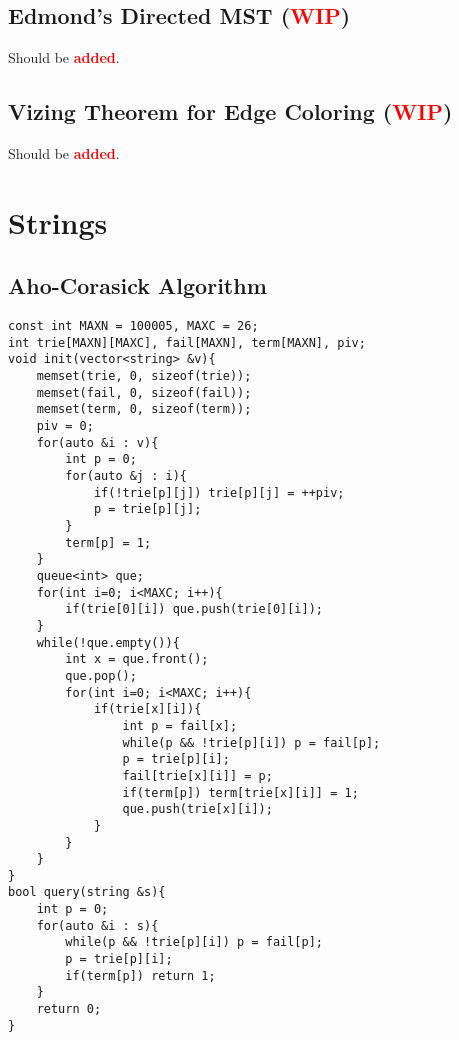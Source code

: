 \documentclass[landscape, 8pt, a4paper, oneside,  twocolumn]{extarticle}
\newcommand{\added}{Should be \textcolor{red}{\textbf{added}}.}
\newcommand{\WIP}{\textcolor{red}{\textbf{WIP}}}
\begin{document}
\subsection {Edmond's Directed MST (\WIP)}
\added

\subsection {Vizing Theorem for Edge Coloring (\WIP)}
\added

\section{Strings}

\subsection{Aho-Corasick Algorithm}
\begin{verbatim}
const int MAXN = 100005, MAXC = 26;
int trie[MAXN][MAXC], fail[MAXN], term[MAXN], piv;
void init(vector<string> &v){
	memset(trie, 0, sizeof(trie));
	memset(fail, 0, sizeof(fail));
	memset(term, 0, sizeof(term));
	piv = 0;
	for(auto &i : v){
		int p = 0;
		for(auto &j : i){
			if(!trie[p][j]) trie[p][j] = ++piv;
			p = trie[p][j];
		}
		term[p] = 1;
	}
	queue<int> que;
	for(int i=0; i<MAXC; i++){
		if(trie[0][i]) que.push(trie[0][i]);
	}
	while(!que.empty()){
		int x = que.front();
		que.pop();
		for(int i=0; i<MAXC; i++){
			if(trie[x][i]){
				int p = fail[x];
				while(p && !trie[p][i]) p = fail[p];
				p = trie[p][i];
				fail[trie[x][i]] = p;
				if(term[p]) term[trie[x][i]] = 1;
				que.push(trie[x][i]);
			}
		}
	}
}
bool query(string &s){
	int p = 0;
	for(auto &i : s){
		while(p && !trie[p][i]) p = fail[p];
		p = trie[p][i];
		if(term[p]) return 1;
	}
	return 0;
}
\end{verbatim}
\end{document}
